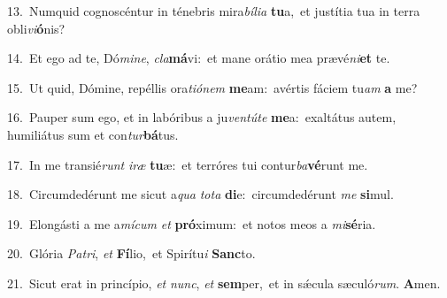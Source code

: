 {\numbfont\textcolor{\numbcolor}{13.}}~Numquid cognoscéntur in ténebris mira\-\textit{bí}\-\textit{li}\textit{a} \textbf{tu}\-a,~\star et justítia tua in terra obli\-\textit{vi}\-\textbf{ó}nis?\par
{\numbfont\textcolor{\numbcolor}{14.}}~Et ego ad te, Dó\-\textit{mi}\-\textit{ne}, \textit{cla}\-\textbf{má}vi:~\star et mane orátio mea prævé\-\textit{ni}\-\textbf{et} te.\par
{\numbfont\textcolor{\numbcolor}{15.}}~Ut quid, Dómine, repéllis ora\-\textit{ti}\-\textit{ó}\textit{nem} \textbf{me}\-am:~\star avértis fáciem tu\textit{am} \textbf{a} me?\par
{\numbfont\textcolor{\numbcolor}{16.}}~Pauper sum ego, et in labóribus a ju\-\textit{ven}\-\textit{tú}\textit{te} \textbf{me}\-a:~\star exaltátus autem, humiliátus sum et con\-\textit{tur}\-\textbf{bá}tus.\par
{\numbfont\textcolor{\numbcolor}{17.}}~In me transié\textit{runt} \textit{i}\-\textit{ræ} \textbf{tu}\-æ:~\star et terróres tui contur\-\textit{ba}\-\textbf{vé}runt me.\par
{\numbfont\textcolor{\numbcolor}{18.}}~Circumdedérunt me sicut a\textit{qua} \textit{to}\-\textit{ta} \textbf{di}\-e:~\star circumdedérunt \textit{me} \textbf{si}\-mul.\par
{\numbfont\textcolor{\numbcolor}{19.}}~Elongásti a me a\-\textit{mí}\-\textit{cum} \textit{et} \textbf{pró}\-ximum:~\star et notos meos a \textit{mi}\-\textbf{sé}ria.\par
{\numbfont\textcolor{\numbcolor}{20.}}~Glória \textit{Pa}\-\textit{tri}, \textit{et} \textbf{Fí}\-lio,~\star et Spirítu\textit{i} \textbf{Sanc}\-to.\par
{\numbfont\textcolor{\numbcolor}{21.}}~Sicut erat in princípio, \textit{et} \textit{nunc}\-, \textit{et} \textbf{sem}\-per,~\star et in sǽcula sæculó\-\textit{rum}\-. \textbf{A}\-men.\par
